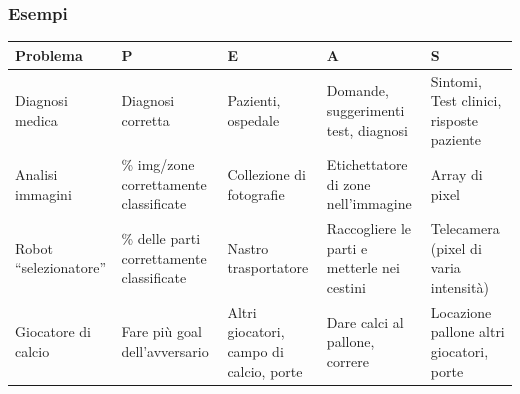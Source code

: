 \documentclass[../main.tex]{subfiles}
\begin{document}
	\subsubsection{Esempi}
	\begin{tabular}{|>{\raggedright\arraybackslash}p{3cm}|>{\raggedright\arraybackslash}p{3cm}|>{\raggedright\arraybackslash}p{3cm}|>{\raggedright\arraybackslash}p{3cm}|>{\raggedright\arraybackslash}p{3.5cm}|}
		\hline
		\textbf{Problema} & \textbf{P} & \textbf{E} & \textbf{A} & \textbf{S} \\
		\hline
		Diagnosi medica & Diagnosi corretta & Pazienti, ospedale & Domande, suggerimenti test, diagnosi & Sintomi, Test clinici, risposte paziente \\
		\hline
		Analisi immagini & \% img/zone correttamente classificate & Collezione di fotografie & Etichettatore di zone nell’immagine & Array di pixel \\
		\hline
		Robot “selezionatore” & \% delle parti correttamente classificate & Nastro trasportatore & Raccogliere le parti e metterle nei cestini & Telecamera (pixel di varia intensità) \\
		\hline
		Giocatore di calcio & Fare più goal dell’avversario & Altri giocatori, campo di calcio, porte & Dare calci al pallone, correre & Locazione pallone altri giocatori, porte \\
		\hline
	\end{tabular}
\end{document}
